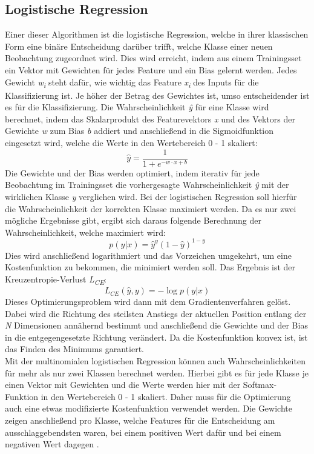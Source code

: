 \subsection{Logistische Regression}
Einer dieser Algorithmen ist die logistische Regression, welche in ihrer klassischen Form eine binäre Entscheidung darüber trifft, welche Klasse einer neuen Beobachtung zugeordnet wird. Dies wird erreicht, indem aus einem Trainingsset ein Vektor mit Gewichten für jedes Feature und ein Bias gelernt werden. Jedes Gewicht \textit{w\textsubscript{i}} steht dafür, wie wichtig das Feature \textit{x\textsubscript{i}} des Inputs für die Klassifizierung ist. Je höher der Betrag des Gewichtes ist, umso entscheidender ist es für die Klassifizierung. Die Wahrscheinlichkeit \textit{\^{y}} für eine Klasse wird berechnet, indem das Skalarprodukt des Featurevektors \textit{x} und des Vektors der Gewichte \textit{w} zum Bias \textit{b} addiert und anschließend in die Sigmoidfunktion eingesetzt wird, welche die Werte in den Wertebereich 0 - 1 skaliert: 
\[ \hat{y} = \frac{1}{1 + e^{-w \cdot x + b}} \]
Die Gewichte und der Bias werden optimiert, indem iterativ für jede Beobachtung im Trainingsset die vorhergesagte Wahrscheinlichkeit \textit{\^{y}} mit der wirklichen Klasse \textit{y} verglichen wird. Bei der logistischen Regression soll hierfür die Wahrscheinlichkeit der korrekten Klasse maximiert werden. Da es nur zwei mögliche Ergebnisse gibt, ergibt sich daraus folgende Berechnung der Wahrscheinlichkeit, welche maximiert wird:
\[ p(y|x) = \hat{y}^y (1-\hat{y})^{1-y} \]
Dies wird anschließend logarithmiert und das Vorzeichen umgekehrt, um eine Kostenfunktion zu bekommen, die minimiert werden soll. Das Ergebnis ist der Kreuzentropie-Verlust \textit{L\textsubscript{CE}}:
\[ L_{CE}(\hat{y},y) = -\log{p(y|x)} \]
Dieses Optimierungsproblem wird dann mit dem Gradientenverfahren gelöst. Dabei wird die Richtung des steilsten Anstiegs der aktuellen Position entlang der \textit{N} Dimensionen annähernd bestimmt und anschließend die Gewichte und der Bias in die entgegengesetzte Richtung verändert. Da die Kostenfunktion konvex ist, ist das Finden des Minimums garantiert.\\
Mit der multinomialen logistischen Regression können auch Wahrscheinlichkeiten für mehr als nur zwei Klassen berechnet werden. Hierbei gibt es für jede Klasse je einen Vektor mit Gewichten und die Werte werden hier mit der Softmax-Funktion in den Wertebereich 0 - 1 skaliert. Daher muss für die Optimierung auch eine etwas modifizierte Kostenfunktion verwendet werden. Die Gewichte zeigen anschließend pro Klasse, welche Features für die Entscheidung am ausschlaggebendsten waren, bei einem positiven Wert dafür und bei einem negativen Wert dagegen \cite[K.~5]{jurafsky2014speech}.


